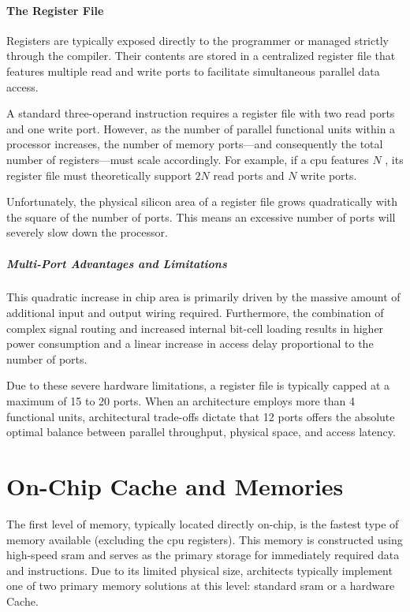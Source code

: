 \paragraph{The Register File} 
Registers are typically exposed directly to the programmer or managed strictly through the compiler. Their contents are stored in a centralized register file that features multiple read and write ports to facilitate simultaneous parallel data access. 

A standard three-operand instruction requires a register file with two read ports and one write port. However, as the number of parallel functional units within a processor increases, the number of memory ports—and consequently the total number of registers—must scale accordingly. For example, if a \gls{cpu} features $N$ , its register file must theoretically support $2N$ read ports and $N$ write ports. 

Unfortunately, the physical silicon area of a register file grows quadratically with the square of the number of ports. This means an excessive number of ports will severely slow down the processor.

\subparagraph{Multi-Port Advantages and Limitations} 
This quadratic increase in chip area is primarily driven by the massive amount of additional input and output wiring required. Furthermore, the combination of complex signal routing and increased internal bit-cell loading results in higher power consumption and a linear increase in access delay proportional to the number of ports. 

Due to these severe hardware limitations, a register file is typically capped at a maximum of 15 to 20 ports. When an architecture employs more than 4 functional units, architectural trade-offs dictate that 12 ports offers the absolute optimal balance between parallel throughput, physical space, and access latency.

\section{On-Chip Cache and  Memories}
The first level of memory, typically located directly on-chip, is the fastest type of memory available (excluding the \gls{cpu} registers). This memory is constructed using high-speed \gls{sram} and serves as the primary storage for immediately required data and instructions. Due to its limited physical size, architects typically implement one of two primary memory solutions at this level: standard \gls{sram} or a hardware Cache.

